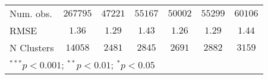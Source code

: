 \begin{table}[!htbp]
\begin{center}
\begin{tabular}{l c c c c c c}
Num. obs.             & $267795$      & $47221$       & $55167$       & $50002$       & $55299$       & $60106$       \\
RMSE                  & $1.36$        & $1.29$        & $1.43$        & $1.26$        & $1.29$        & $1.44$        \\
N Clusters            & $14058$       & $2481$        & $2845$        & $2691$        & $2882$        & $3159$        \\
\hline
\multicolumn{7}{l}{\scriptsize{$^{***}p<0.001$; $^{**}p<0.01$; $^{*}p<0.05$}}
\end{tabular}
\label{table_a1}
\end{center}
\end{table}
